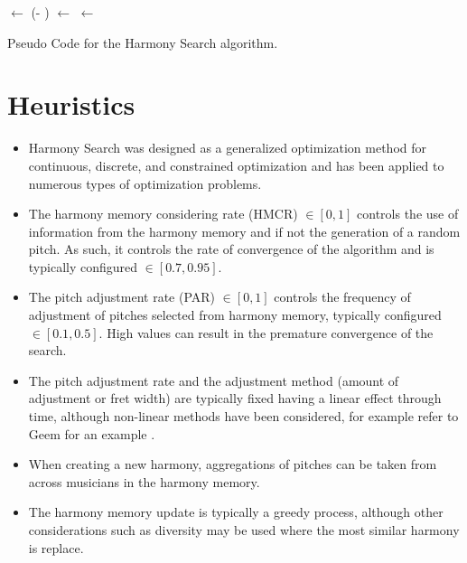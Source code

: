 \documentclass[a4paper, 11pt]{article}
\begin{document}
\begin{algorithm}[ht]
{		\RemainingBees $\leftarrow$ (\NumBees - \NumSites)\;
		 {
			\NextGeneration $\leftarrow$ \CreateRandomBee{}\;
		}
		\Population $\leftarrow$ \NextGeneration\;
	}
	\Return{\Best}\;
	\caption{Pseudo Code for the Harmony Search algorithm.}
	\label{alg:harmony_search}
\end{algorithm}

\section{Heuristics}
\label{sec:heuristics}
\begin{itemize}
	\item Harmony Search was designed as a generalized optimization method for continuous, discrete, and constrained optimization and has been applied to numerous types of optimization problems.
	\item The harmony memory considering rate (HMCR) $\in [0,1]$ controls the use of information from the harmony memory and if not the generation of a random pitch. As such, it controls the rate of convergence of the algorithm and is typically configured $\in [0.7,0.95]$.
	\item The pitch adjustment rate (PAR) $\in [0,1]$ controls the frequency of adjustment of pitches selected from harmony memory, typically configured $\in [0.1,0.5]$. High values can result in the premature convergence of the search.
	\item The pitch adjustment rate and the adjustment method (amount of adjustment or fret width) are typically fixed having a linear effect through time, although non-linear methods have been considered, for example refer to Geem for an example \cite{Geem2010a}.
	\item When creating a new harmony, aggregations of pitches can be taken from across musicians in the harmony memory.
	\item The harmony memory update is typically a greedy process, although other considerations such as diversity may be used where the most similar harmony is replace.
\end{itemize}
\end{document}
